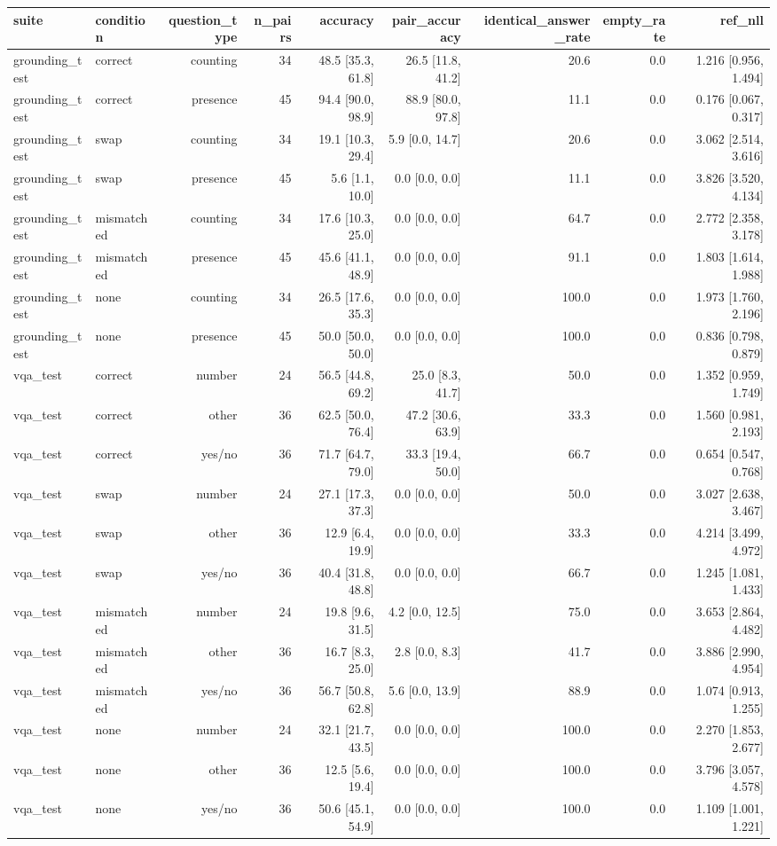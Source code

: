 \begin{tabular}{llrrrrrrr}
\toprule
suite & condition & question\_type & n\_pairs & accuracy & pair\_accuracy & identical\_answer\_rate & empty\_rate & ref\_nll \\
\midrule
grounding\_test & correct & counting & 34 & 48.5 [35.3, 61.8] & 26.5 [11.8, 41.2] & 20.6 & 0.0 & 1.216 [0.956, 1.494] \\
grounding\_test & correct & presence & 45 & 94.4 [90.0, 98.9] & 88.9 [80.0, 97.8] & 11.1 & 0.0 & 0.176 [0.067, 0.317] \\
grounding\_test & swap & counting & 34 & 19.1 [10.3, 29.4] & 5.9 [0.0, 14.7] & 20.6 & 0.0 & 3.062 [2.514, 3.616] \\
grounding\_test & swap & presence & 45 & 5.6 [1.1, 10.0] & 0.0 [0.0, 0.0] & 11.1 & 0.0 & 3.826 [3.520, 4.134] \\
grounding\_test & mismatched & counting & 34 & 17.6 [10.3, 25.0] & 0.0 [0.0, 0.0] & 64.7 & 0.0 & 2.772 [2.358, 3.178] \\
grounding\_test & mismatched & presence & 45 & 45.6 [41.1, 48.9] & 0.0 [0.0, 0.0] & 91.1 & 0.0 & 1.803 [1.614, 1.988] \\
grounding\_test & none & counting & 34 & 26.5 [17.6, 35.3] & 0.0 [0.0, 0.0] & 100.0 & 0.0 & 1.973 [1.760, 2.196] \\
grounding\_test & none & presence & 45 & 50.0 [50.0, 50.0] & 0.0 [0.0, 0.0] & 100.0 & 0.0 & 0.836 [0.798, 0.879] \\
vqa\_test & correct & number & 24 & 56.5 [44.8, 69.2] & 25.0 [8.3, 41.7] & 50.0 & 0.0 & 1.352 [0.959, 1.749] \\
vqa\_test & correct & other & 36 & 62.5 [50.0, 76.4] & 47.2 [30.6, 63.9] & 33.3 & 0.0 & 1.560 [0.981, 2.193] \\
vqa\_test & correct & yes/no & 36 & 71.7 [64.7, 79.0] & 33.3 [19.4, 50.0] & 66.7 & 0.0 & 0.654 [0.547, 0.768] \\
vqa\_test & swap & number & 24 & 27.1 [17.3, 37.3] & 0.0 [0.0, 0.0] & 50.0 & 0.0 & 3.027 [2.638, 3.467] \\
vqa\_test & swap & other & 36 & 12.9 [6.4, 19.9] & 0.0 [0.0, 0.0] & 33.3 & 0.0 & 4.214 [3.499, 4.972] \\
vqa\_test & swap & yes/no & 36 & 40.4 [31.8, 48.8] & 0.0 [0.0, 0.0] & 66.7 & 0.0 & 1.245 [1.081, 1.433] \\
vqa\_test & mismatched & number & 24 & 19.8 [9.6, 31.5] & 4.2 [0.0, 12.5] & 75.0 & 0.0 & 3.653 [2.864, 4.482] \\
vqa\_test & mismatched & other & 36 & 16.7 [8.3, 25.0] & 2.8 [0.0, 8.3] & 41.7 & 0.0 & 3.886 [2.990, 4.954] \\
vqa\_test & mismatched & yes/no & 36 & 56.7 [50.8, 62.8] & 5.6 [0.0, 13.9] & 88.9 & 0.0 & 1.074 [0.913, 1.255] \\
vqa\_test & none & number & 24 & 32.1 [21.7, 43.5] & 0.0 [0.0, 0.0] & 100.0 & 0.0 & 2.270 [1.853, 2.677] \\
vqa\_test & none & other & 36 & 12.5 [5.6, 19.4] & 0.0 [0.0, 0.0] & 100.0 & 0.0 & 3.796 [3.057, 4.578] \\
vqa\_test & none & yes/no & 36 & 50.6 [45.1, 54.9] & 0.0 [0.0, 0.0] & 100.0 & 0.0 & 1.109 [1.001, 1.221] \\
\bottomrule
\end{tabular}
